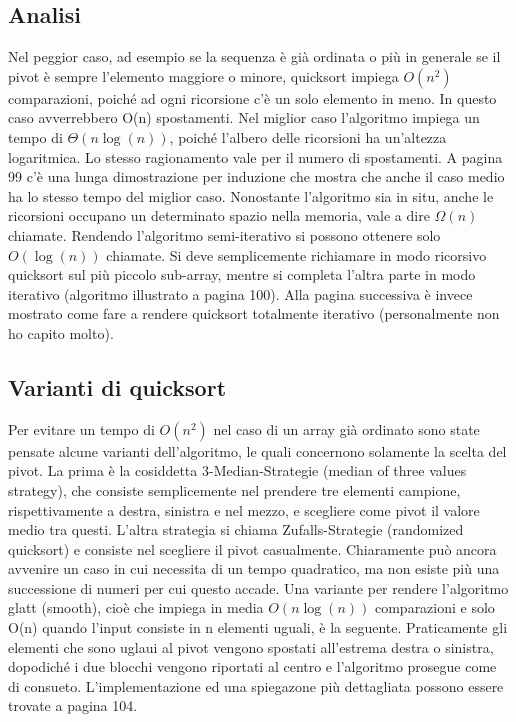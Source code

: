 \documentclass[a4paper]{book}
\begin{document}
\subsection*{Analisi}

Nel peggior caso, ad esempio se la sequenza è già ordinata o più in generale se il pivot è sempre l'elemento maggiore o minore, quicksort impiega $O(n^2)$ comparazioni, poiché ad ogni ricorsione c'è un solo elemento in meno. In questo caso avverrebbero O(n) spostamenti. Nel miglior caso l'algoritmo impiega un tempo di $\Theta (n\log (n))$, poiché l'albero delle ricorsioni ha un'altezza logaritmica. Lo stesso ragionamento vale per il numero di spostamenti. A pagina 99 c'è una lunga dimostrazione per induzione che mostra che anche il caso medio ha lo stesso tempo del miglior caso. Nonostante l'algoritmo sia in situ, anche le ricorsioni occupano un determinato spazio nella memoria, vale a dire $\Omega (n)$ chiamate. Rendendo l'algoritmo semi-iterativo si possono ottenere solo $O(\log (n))$ chiamate. Si deve semplicemente richiamare in modo ricorsivo quicksort sul più piccolo sub-array, mentre si completa l'altra parte in modo iterativo (algoritmo illustrato a pagina 100). Alla pagina successiva è invece mostrato come fare a rendere quicksort totalmente iterativo (personalmente non ho capito molto). 
            
\subsection*{Varianti di quicksort}
Per evitare un tempo di $O(n^2)$ nel caso di un array già ordinato sono state pensate alcune varianti dell'algoritmo, le quali concernono solamente la scelta del pivot. La prima è la cosiddetta 3-Median-Strategie (median of three values strategy), che consiste semplicemente nel prendere tre elementi campione, rispettivamente a destra, sinistra e nel mezzo, e scegliere come pivot il valore medio tra questi.
L'altra strategia si chiama Zufalls-Strategie (randomized quicksort) e consiste nel scegliere il pivot casualmente. Chiaramente può ancora avvenire un caso in cui necessita di un tempo quadratico, ma non esiste più una successione di numeri per cui questo accade. Una variante per rendere l'algoritmo glatt (smooth), cioè che impiega in media $O(n \log (n))$ comparazioni e  solo O(n) quando l'input consiste in n elementi uguali, è la seguente. Praticamente gli elementi che sono uglaui al pivot vengono spostati all'estrema destra o sinistra, dopodiché i due blocchi vengono riportati al centro e l'algoritmo prosegue come di consueto. L'implementazione ed una spiegazone più dettagliata possono essere trovate a pagina 104.
\end{document}
